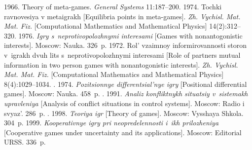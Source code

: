   \begin{multicols}{2}

\renewcommand{\bibname}{\protect\rmfamily References}



{\small\frenchspacing
 {%
 \begin{thebibliography}{99}



 1966. Theory of meta-games. \textit{General Systems}
11:187--200.
 1974. Tochki ravnovesiya v metaigrakh [Equilibria points in
meta-games]. \textit{Zh. Vychisl. Mat. Mat. Fiz.} [Computational Mathematics and
Mathematical Physics] 14(2):312--320.
 1976. \textit{Igry s~neprotivopolozhnymi interesami}
[Games with nonantogonistic interests]. Moscow: Nauka. 326~p.
 1972. Rol' vzaimnoy informirovannosti storon v~igrakh dvuh
lits s~neprotivopolozhnymi interesami [Role of partners mutual information in two
person games with nonantogonistic interests]. \textit{Zh. Vychisl. Mat. Mat. Fiz.}
[Computational Mathematics and Mathematical Physics] 8(4):1029--1034.
. 1974. \textit{Pozitsionnye
differentsial'nye igry} [Positional differential games]. Moscow: Nauka. 458~p.
. 1991. \textit{Analiz
konfliktnykh situatsiy v~sistemakh upravleniya} [Analysis of conflict situations in
control systems]. Moscow: Radio i svyaz'. 286~p.
. 1998. \textit{Teoriya
igr} [Theory of games]. Moscow: Vysshaya Shkola. 304~p.
 1999. \textit{Kooperativnye igry pri neopredelennosti i~ikh
prilozheniya} [Cooperative games under uncertainty and its applications]. Moscow:
Editorial URSS. 336~p.



\end{thebibliography}}}
\end{multicols}
